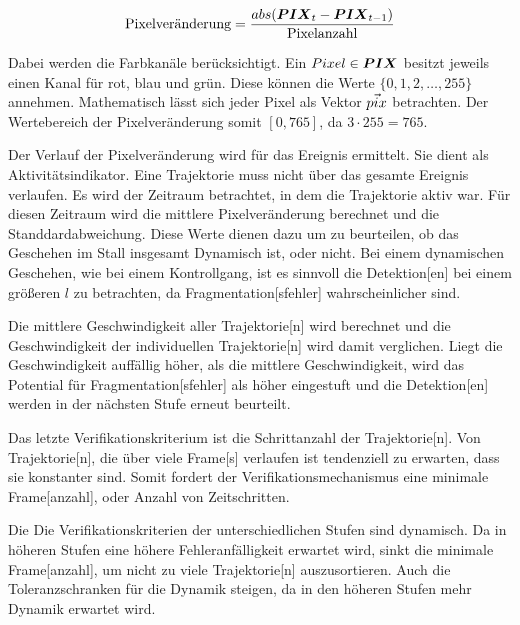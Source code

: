 \begin{equation}
\text{Pixelveränderung} = \frac{abs(\boldsymbol{PIX}_t - \boldsymbol{PIX}_{t-1})}{\text{Pixelanzahl}}
\label{eq:Pixelveränderung}
\end{equation}

Dabei werden die Farbkanäle berücksichtigt. Ein \(Pixel \in \boldsymbol{PIX}\) besitzt jeweils einen Kanal für rot, blau und grün. Diese können die Werte \(\{0,1,2, \dots, 255\}\) annehmen. Mathematisch lässt sich jeder Pixel als Vektor \(\vec{pix}\) betrachten. Der Wertebereich der Pixelveränderung somit \([0, 765]\), da \(3 \cdot 255 = 765\). \par

Der Verlauf der Pixelveränderung wird für das Ereignis ermittelt. Sie dient als Aktivitätsindikator. Eine \gls{Trajektorie} muss nicht über das gesamte Ereignis verlaufen. Es wird der Zeitraum betrachtet, in dem die \gls{Trajektorie} aktiv war. Für diesen Zeitraum wird die mittlere Pixelveränderung berechnet und die Standdardabweichung. Diese Werte dienen dazu um zu beurteilen, ob das Geschehen im Stall insgesamt Dynamisch ist, oder nicht. Bei einem dynamischen Geschehen, wie bei einem Kontrollgang, ist es sinnvoll die \gls{Detektion}[en] bei einem größeren \(l\) zu betrachten, da \gls{Fragmentation}[sfehler] wahrscheinlicher sind. \par

Die mittlere Geschwindigkeit aller \gls{Trajektorie}[n] wird berechnet und die Geschwindigkeit der individuellen \gls{Trajektorie}[n] wird damit verglichen. Liegt die Geschwindigkeit auffällig höher, als die mittlere Geschwindigkeit, wird das Potential für \gls{Fragmentation}[sfehler] als höher eingestuft und die \gls{Detektion}[en] werden in der nächsten Stufe erneut beurteilt. \par

Das letzte Verifikationskriterium ist die Schrittanzahl der \gls{Trajektorie}[n]. Von \gls{Trajektorie}[n], die über viele \gls{Frame}[s] verlaufen ist tendenziell zu erwarten, dass sie konstanter sind. Somit fordert der Verifikationsmechanismus eine minimale \gls{Frame}[anzahl], oder Anzahl von Zeitschritten.\par

Die Die Verifikationskriterien der unterschiedlichen Stufen sind dynamisch. Da in höheren Stufen eine höhere Fehleranfälligkeit erwartet wird, sinkt die minimale \gls{Frame}[anzahl], um nicht zu viele \gls{Trajektorie}[n] auszusortieren. Auch die Toleranzschranken für die Dynamik steigen, da in den höheren Stufen mehr Dynamik erwartet wird. \par



